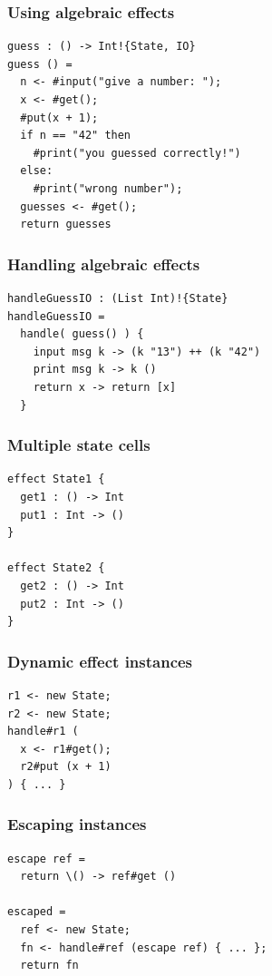 \documentclass{beamer}
\begin{document}
\begin{frame}[fragile]\frametitle{Using algebraic effects}
	\begin{example}
		\begin{verbatim}
guess : () -> Int!{State, IO}
guess () =
  n <- #input("give a number: ");
  x <- #get();
  #put(x + 1);
  if n == "42" then
    #print("you guessed correctly!")
  else:
    #print("wrong number");
  guesses <- #get();
  return guesses
		\end{verbatim}
	\end{example}
\end{frame}

\begin{frame}[fragile]\frametitle{Handling algebraic effects}
	\begin{example}
		\begin{verbatim}
handleGuessIO : (List Int)!{State}
handleGuessIO =
  handle( guess() ) {
    input msg k -> (k "13") ++ (k "42")
    print msg k -> k ()
    return x -> return [x]
  }
		\end{verbatim}
	\end{example}
\end{frame}

\begin{frame}[fragile]\frametitle{Multiple state cells}
	\begin{example}
		\begin{verbatim}
effect State1 {
  get1 : () -> Int
  put1 : Int -> ()
}

effect State2 {
  get2 : () -> Int
  put2 : Int -> ()
}
		\end{verbatim}
	\end{example}
\end{frame}

\begin{frame}[fragile]\frametitle{Dynamic effect instances}
	\begin{example}
		\begin{verbatim}
r1 <- new State;
r2 <- new State;
handle#r1 (
  x <- r1#get();
  r2#put (x + 1)
) { ... }
		\end{verbatim}
	\end{example}
\end{frame}

\begin{frame}[fragile]\frametitle{Escaping instances}
	\begin{example}
		\begin{verbatim}
escape ref =
  return \() -> ref#get ()

escaped =
  ref <- new State;
  fn <- handle#ref (escape ref) { ... };
  return fn
		\end{verbatim}
	\end{example}
\end{frame}
\end{document}
